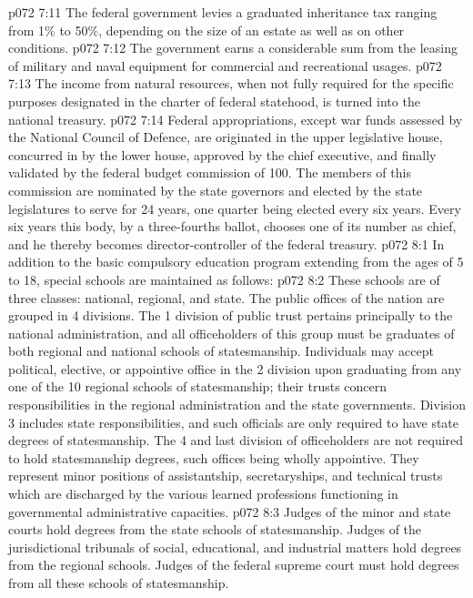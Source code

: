 \vs p072 7:11 \bibnobreakspace {} The federal government levies a graduated inheritance tax ranging from 1\% to 50\%, depending on the size of an estate as well as on other conditions.
\vs p072 7:12 \bibnobreakspace {} The government earns a considerable sum from the leasing of military and naval equipment for commercial and recreational usages.
\vs p072 7:13 \bibnobreakspace {} The income from natural resources, when not fully required for the specific purposes designated in the charter of federal statehood, is turned into the national treasury.
\vs p072 7:14 \pc Federal appropriations, except war funds assessed by the National Council of Defence, are originated in the upper legislative house, concurred in by the lower house, approved by the chief executive, and finally validated by the federal budget commission of 100. The members of this commission are nominated by the state governors and elected by the state legislatures to serve for 24 years, one quarter being elected every six years. Every six years this body, by a three\hyp{}fourths ballot, chooses one of its number as chief, and he thereby becomes director\hyp{}controller of the federal treasury.
\vs p072 8:1 In addition to the basic compulsory education program extending from the ages of 5 to 18, special schools are maintained as follows:
\vs p072 8:2 \bibnobreakspace {} These schools are of three classes: national, regional, and state. The public offices of the nation are grouped in 4 divisions. The 1 division of public trust pertains principally to the national administration, and all officeholders of this group must be graduates of both regional and national schools of statesmanship. Individuals may accept political, elective, or appointive office in the 2 division upon graduating from any one of the 10 regional schools of statesmanship; their trusts concern responsibilities in the regional administration and the state governments. Division 3 includes state responsibilities, and such officials are only required to have state degrees of statesmanship. The 4 and last division of officeholders are not required to hold statesmanship degrees, such offices being wholly appointive. They represent minor positions of assistantship, secretaryships, and technical trusts which are discharged by the various learned professions functioning in governmental administrative capacities.
\vs p072 8:3 Judges of the minor and state courts hold degrees from the state schools of statesmanship. Judges of the jurisdictional tribunals of social, educational, and industrial matters hold degrees from the regional schools. Judges of the federal supreme court must hold degrees from all these schools of statesmanship.
